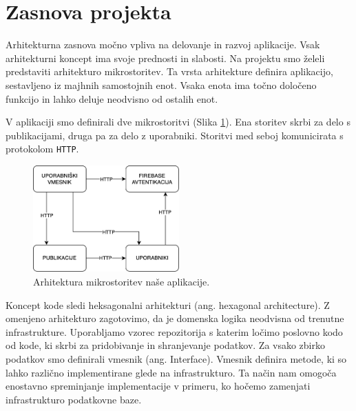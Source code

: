 \documentclass[a4paper, 12pt]{book}
\begin{document}

\section{Zasnova projekta}
Arhitekturna zasnova močno vpliva na delovanje in razvoj aplikacije. Vsak arhitekturni koncept ima svoje prednosti in slabosti. Na projektu smo želeli predstaviti arhitekturo mikrostoritev. Ta vrsta arhitekture definira aplikacijo, sestavljeno iz majhnih samostojnih enot. Vsaka enota ima točno določeno funkcijo in lahko deluje neodvisno od ostalih enot.

V aplikaciji smo definirali dve mikrostoritvi (Slika \ref{app-architecture}). Ena storitev skrbi za delo s publikacijami, druga pa za delo z uporabniki. Storitvi med seboj komunicirata s protokolom \verb=HTTP=.

\begin{figure}[h]
\begin{center}
\includegraphics[width=0.5\textwidth]{slike/arhitecture.png}
\end{center}
\caption{ Arhitektura mikrostoritev naše aplikacije. }
\label{app-architecture}
\end{figure}



Koncept kode sledi heksagonalni arhitekturi (ang. hexagonal architecture). Z omenjeno arhitekturo zagotovimo, da je domenska logika neodvisna od trenutne infrastrukture. Uporabljamo vzorec repozitorija s katerim ločimo poslovno kodo od kode, ki skrbi za pridobivanje in shranjevanje podatkov. Za vsako zbirko podatkov smo definirali vmesnik (ang. Interface). Vmesnik definira metode, ki so lahko različno implementirane glede na infrastrukturo. Ta način nam omogoča enostavno spreminjanje implementacije v primeru, ko hočemo zamenjati infrastrukturo podatkovne baze.
\end{document}
